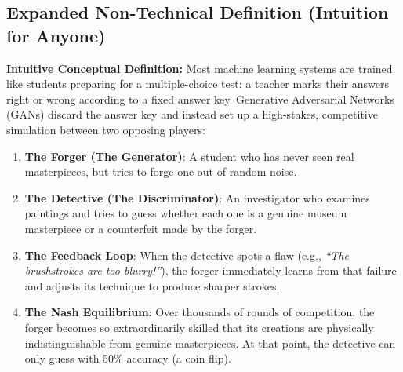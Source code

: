 \documentclass[11pt,a4paper]{article}
\theoremstyle{definition}
\begin{document}
\subsection{Expanded Non-Technical Definition (Intuition for Anyone)}
\textbf{Intuitive Conceptual Definition:}
Most machine learning systems are trained like students preparing for a multiple-choice test: a teacher marks their answers right or wrong according to a fixed answer key. Generative Adversarial Networks (GANs) discard the answer key and instead set up a high-stakes, competitive simulation between two opposing players:
\begin{enumerate}
    \item \textbf{The Forger (The Generator)}: A student who has never seen real masterpieces, but tries to forge one out of random noise.
    \item \textbf{The Detective (The Discriminator)}: An investigator who examines paintings and tries to guess whether each one is a genuine museum masterpiece or a counterfeit made by the forger.
    \item \textbf{The Feedback Loop}: When the detective spots a flaw (e.g., \emph{``The brushstrokes are too blurry!''}), the forger immediately learns from that failure and adjusts its technique to produce sharper strokes.
    \item \textbf{The Nash Equilibrium}: Over thousands of rounds of competition, the forger becomes so extraordinarily skilled that its creations are physically indistinguishable from genuine masterpieces. At that point, the detective can only guess with 50\% accuracy (a coin flip).
\end{enumerate}
\end{document}
